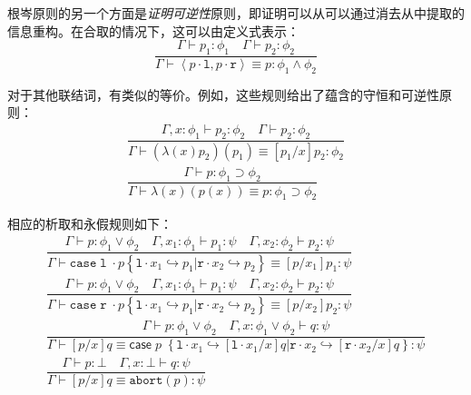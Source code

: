 根岑原则的另一个方面是\textit{证明可逆性}原则，即证明可以从可以通过消去从中提取的信息重构。在合取的情况下，这可以由定义式表示：
\begin{equation}
       \dfrac{\Gamma \vdash p_1 : \phi_1 \quad\Gamma \vdash p_2:\phi_2}
             {\Gamma \vdash \left \langle p \cdot \mathtt{l},p \cdot \mathtt{r} \right \rangle \equiv p : \phi_1 \land \phi_2 }
\end{equation}

对于其他联结词，有类似的等价。例如，这些规则给出了蕴含的守恒和可逆性原则：
\begin{subequations}
    \begin{gather}
       \dfrac{\Gamma,x : \phi_1 \vdash p_2 : \phi_2\quad\Gamma \vdash p_2 : \phi_2}
             {\Gamma \vdash \left(\lambda\left(x\right)p_2\right)\left(p_1\right) \equiv\left[p_1/x\right] p_2: \phi_2} \\
       \dfrac{\Gamma \vdash p : \phi_1 \supset \phi_2 }
             {\Gamma \vdash \lambda\left(x\right)\left(p\left(x\right)\right) \equiv p : \phi_1 \supset \phi_2}
    \end{gather}
\end{subequations}

相应的析取和永假规则如下：
\begin{subequations}
    \begin{gather}
       \dfrac{\Gamma \vdash p : \phi_1 \lor \phi_2\quad\Gamma,x_1 : \phi_1 \vdash p_1 : \psi\quad\Gamma,x_2 : \phi_2 \vdash p_2 : \psi}
             { \Gamma \vdash \mathtt{case}\; \mathtt{l}\; \cdot p\left\{\mathtt{l} \cdot x_1\hookrightarrow p_1 | \mathtt{r} \cdot x_2\hookrightarrow p_2\right\} \equiv \left[p/x_1\right]p_1 : \psi}\\
       \dfrac{\Gamma \vdash p : \phi_1 \lor \phi_2\quad\Gamma,x_1 : \phi_1 \vdash p_1 : \psi\quad\Gamma,x_2 : \phi_2 \vdash p_2 : \psi}
             { \Gamma \vdash \mathtt{case}\; \mathtt{r}\; \cdot p\left\{\mathtt{l} \cdot x_1\hookrightarrow p_1 | \mathtt{r} \cdot x_2\hookrightarrow p_2\right\} \equiv \left[p/x_2\right] p_2  : \psi}\\
       \dfrac{\Gamma \vdash p : \phi_1 \lor \phi_2\quad\Gamma,x : \phi_1 \lor \phi_2 \vdash q : \psi}
             { \Gamma \vdash   \left[p/x\right]q \equiv \mathsf{case}\; p\; \left\{ \mathtt{l} \cdot x_1\hookrightarrow \left[\mathtt{l} \cdot x_1/x\right] q| \mathtt{r} \cdot x_2\hookrightarrow \left[\mathtt{r} \cdot x_2/x\right] q\right\}: \psi}\\
       \dfrac{\Gamma \vdash p : \bot\quad\Gamma,x : \bot \vdash q : \psi}
             {\Gamma \vdash \left[p/x\right]q \equiv \mathtt{abort}\left(p\right) : \psi}
    \end{gather}
\end{subequations}

